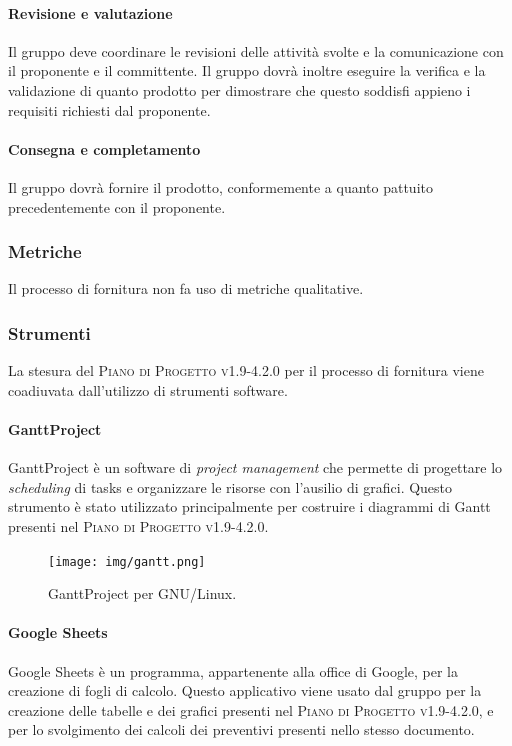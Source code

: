 \documentclass[../norme-di-progetto.tex]{subfiles}
\begin{document}
\paragraph{Revisione e valutazione}
Il gruppo deve coordinare le revisioni delle attività svolte e la comunicazione con il proponente e il committente. Il gruppo dovrà inoltre eseguire la verifica e la validazione di quanto prodotto per dimostrare che questo soddisfi appieno i requisiti richiesti dal proponente.

\paragraph{Consegna e completamento}
Il gruppo dovrà fornire il prodotto, conformemente a quanto pattuito precedentemente con il proponente.

\subsubsection{Metriche}
Il processo di fornitura non fa uso di metriche qualitative.

\subsubsection{Strumenti}
La stesura del \textsc{Piano di Progetto v1.9-4.2.0} per il processo di fornitura viene coadiuvata dall'utilizzo di strumenti software.

\paragraph{GanttProject}
GanttProject è un software di \textit{project management} che permette di progettare lo \textit{scheduling} di tasks e organizzare le risorse con l'ausilio di grafici. Questo strumento è stato utilizzato principalmente per costruire i diagrammi di Gantt presenti nel \textsc{Piano di Progetto v1.9-4.2.0}.

\begin{figure}[H]
  \centering
  \texttt{[image: img/gantt.png]}
  \label{fig:gantt}
  \caption{GanttProject per GNU/Linux.}
\end{figure}

\paragraph{Google Sheets}
Google Sheets è un programma, appartenente alla  office di Google, per la creazione di fogli di calcolo. Questo applicativo viene usato dal gruppo per la creazione delle tabelle e dei grafici presenti nel \textsc{Piano di Progetto v1.9-4.2.0}, e per lo svolgimento dei calcoli dei preventivi presenti nello stesso documento.
\end{document}
